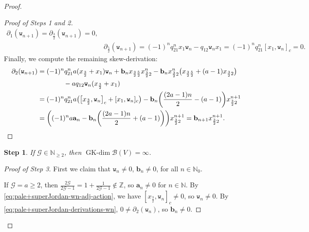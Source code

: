 \documentclass[10pt,a4paper]{amsart}
\numberwithin{equation}{section}
\newtheorem{stepv}{Step}
\newcommand{\GK}{\operatorname{GK-dim}}
\newcommand{\toba}{\mathscr B}
\newcommand{\ghost}{\mathscr{G}}
\newcommand{\ab}{\mathbf a}
\newcommand{\bb}{\mathbf b}
\newcommand{\N}{{\mathbb N}}
\newcommand{\Z}{{\mathbb Z}}
\newcommand{\wt}{\mathtt{w}}
\newcommand{\tresdos}{\frac{3}{2}}
\newcommand{\cincodos}{\frac{5}{2}}
\begin{document}
\begin{proof}
\begin{proof}[Proof of Steps 1 and 2]
\begin{align*}
\partial_1 (\wt_{n+1})=\partial_{\tresdos}(\wt_{n+1})=0,
\\
&\partial_{\cincodos} (\wt_{n+1})
= (-1)^{n} q_{21}^{n}x_1 \wt_n -q_{12}\wt_n x_1
= (-1)^{n} q_{21}^{n} [x_1, \wt_n]_c=0.
\end{align*}
Finally, we compute the remaining skew-derivation:
\begin{align*}
\partial_{2} (\wt_{n+1})
&= (-1)^{n} q_{21}^{n}a(x_{\tresdos}+x_1) \wt_n+\bb_n x_{\tresdos\cincodos}x_{\tresdos2}^{n}
-\bb_n x_{\tresdos2}^{n} \big(x_{\tresdos\cincodos}+(a-1)x_{\tresdos2}\big)
\\ &\hphantom{\partial_{2} (\wt_{n+1})}
-aq_{12}\wt_n (x_{\tresdos}+x_1)
\\
&= (-1)^{n} q_{21}^{n}a \big(\big[x_{\tresdos},\wt_n\big]_c + [x_{1},\wt_n]_c\big)
-\bb_n \bigg(\frac{(2a-1)n}{2}-(a-1)\bigg)x_{\tresdos2}^{n+1}
\\
&= \bigg((-1)^{n} a \ab_n -\bb_n \bigg(\frac{(2a-1)n}{2}+(a-1)\bigg)\bigg) x_{\tresdos2}^{n+1}
= \bb_{n+1} x_{\tresdos2}^{n+1}. \tag*{\qed}
\end{align*}
\renewcommand{\qed}{}
\end{proof}

\begin{stepv}%
If $\ghost\in\N_{\ge 2}$, then $\GK \toba(V)=\infty$.
\end{stepv}

\begin{proof}[Proof of Step 3]
First we claim that $\wt_n \ne 0$, $\bb_n \ne 0$, for all $n\in\N_0$.

If $\ghost=a\ge 2$, then $\tfrac{2\ghost}{2\ghost-1}=1+\tfrac{1}{2\ghost-1}\notin\Z$, so $\ab_n\ne 0$ for $n\in\N$.
By \eqref{eq:pale+superJordan-wn-adj-action}, we have $[x_{\tresdos},\wt_n]_c\ne 0$, so $\wt_n \ne 0$.
By \eqref{eq:pale+superJordan-derivations-wn}, $0\ne \partial_2(\wt_n)$, so $\bb_{n}\ne 0$.


\end{proof}
\end{proof}
\end{document}
